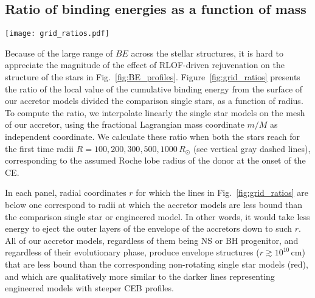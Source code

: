 \documentclass[twocolumn,twocolappendix,trackchanges]{aastex63}
\DeclareRobustCommand{\Figref}[1]{Fig.~\ref{#1}}
\begin{document}
\subsection{Ratio of binding energies as a function of mass}

\begin{figure*}[htbp]
  \texttt{[image: grid\_ratios.pdf]}
  \caption{Ratios of the binding energy profiles (including internal
    energy) of the accretor stars divided stars of the same total mass
    post-RLOF. The red solid lines show the ratio to a non-rotating
    single star, while the other colors show the ratio to
    ``engineered'' star (see text). Each panel shows the ratios at the
    first time the models reach the radius indicated on the right and
    by the vertical dashed gray line.}
  \label{fig:grid_ratios}
\end{figure*}

Because of the large range of $BE$ across the stellar structures, it
is hard to appreciate the magnitude of the effect of RLOF-driven
rejuvenation on the structure of the stars in
\Figref{fig:BE_profiles}. Figure~\ref{fig:grid_ratios} presents the
ratio of the local value of the cumulative binding energy from the
surface of our accretor models divided the
comparison single stars, as a function of radius. To compute the
ratio, we interpolate linearly the single star models on the mesh of
our accretor, using the fractional Lagrangian mass coordinate $m/M$ as
independent coordinate. %
We calculate these ratio
when both the stars reach for the first time radii
$R=100, 200, 300, 500, 1000\,R_\odot$ (see vertical gray dashed
lines), corresponding to the assumed Roche lobe radius of the donor at
the onset of the CE.

In each panel, radial coordinates $r$ for which the lines in
\Figref{fig:grid_ratios} are below one correspond to radii at which
the accretor models are less bound than the comparison single
star or engineered model. In other words, it would take less energy to
eject the outer layers of the envelope of the accretors down to such
$r$. All of our accretor models, regardless of them being NS or BH
progenitor, and regardless of their evolutionary phase, produce
envelope structures ($r\gtrsim 10^{10}\,\mathrm{cm}$) that are less
bound than the corresponding non-rotating single star models (red),
and which are qualitatively more similar to the darker lines
representing engineered models with steeper CEB profiles.
\end{document}
